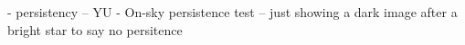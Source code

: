 
- persistency -- YU
- On-sky persistence test -- just showing a dark image after a bright star to say no persitence